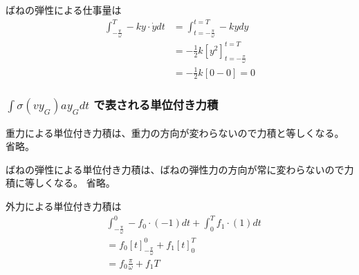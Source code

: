 \documentclass[a4paper,11pt]{jsarticle}
\begin{document}
ばねの弾性による仕事量は
\begin{align}
  \int_{-\frac{\pi}{\omega}}^{T} -ky \cdot \dot{y} dt
   & = \int_{t=-\frac{\pi}{\omega}}^{t=T} -ky dy
  \\
   & = -\frac{1}{2}k \left[ y^2 \right]_{t=-\frac{\pi}{\omega}}^{t=T}
  \\
   & = -\frac{1}{2}k \left[ 0 - 0 \right] = 0
\end{align}

\subsubsection{$\int\sigma (vy_G)ay_G dt$ で表される単位付き力積}
重力による単位付き力積は、重力の方向が変わらないので力積と等しくなる。
省略。

ばねの弾性による単位付き力積は、ばねの弾性力の方向が常に変わらないので力積に等しくなる。
省略。

外力による単位付き力積は
\begin{align}
   & \int_{-\frac{\pi}{\omega}}^{0} -f_0 \cdot (-1) dt
  + \int_{0}^{T} f_1 \cdot (1) dt
  \\
   & = f_0 \left[ t \right]_{-\frac{\pi}{\omega}}^{0}
  + f_1 \left[ t \right]_{0}^{T}
  \\
   & = f_0 \frac{\pi}{\omega} + f_1 T
\end{align}
\end{document}
